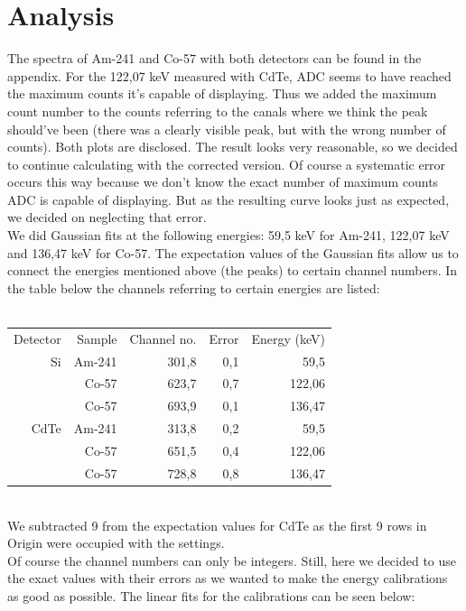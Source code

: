 \section{Analysis}
The spectra of Am-241 and Co-57 with both detectors can be found in the appendix. For the 122,07 keV measured with CdTe, ADC seems to have reached the maximum counts it's capable of displaying. Thus we added the maximum count number to the counts referring to the canals where we think the peak should've been (there was a clearly visible peak, but with the wrong number of counts). Both plots are disclosed. The result looks very reasonable, so we decided to continue calculating with the corrected version. Of course a systematic error occurs this way because we don't know the exact number of maximum counts ADC is capable of displaying. But as the resulting curve looks just as expected, we decided on neglecting that error.\\
We did Gaussian fits at the following energies: 59,5 keV for Am-241, 122,07 keV and 136,47 keV for Co-57. The expectation values of the Gaussian fits allow us to connect the energies mentioned above (the peaks) to certain channel numbers. In the table below the channels referring to certain energies are listed:\\
\\
    \begin{tabular}{rrrrr}
    Detector & Sample & Channel no. & Error & Energy (keV) \\
    Si    & Am-241 & 301,8 & 0,1   & 59,5 \\
          & Co-57 & 623,7 & 0,7   & 122,06 \\
          & Co-57 & 693,9 & 0,1   & 136,47 \\
    CdTe  & Am-241 & 313,8 & 0,2   & 59,5 \\
          & Co-57 & 651,5 & 0,4   & 122,06 \\
          & Co-57 & 728,8 & 0,8   & 136,47 \\
    \end{tabular}%
  \label{tab:addlabel}%
\\
We subtracted 9 from the expectation values for CdTe as the first 9 rows in Origin were occupied with the settings. \\
Of course the channel numbers can only be integers. Still, here we decided to use the exact values with their errors as we wanted to make the energy calibrations as good as possible. The linear fits for the calibrations can be seen below:\\
